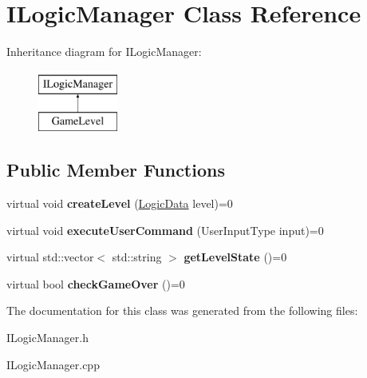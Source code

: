 \hypertarget{class_i_logic_manager}{}\section{I\+Logic\+Manager Class Reference}
\label{class_i_logic_manager}
Inheritance diagram for I\+Logic\+Manager\+:\begin{figure}[H]
\begin{center}
\leavevmode
\includegraphics[height=2.000000cm]{class_i_logic_manager}
\end{center}
\end{figure}
\subsection*{Public Member Functions}
\begin{DoxyCompactItemize}
\item 
\mbox{\label{class_i_logic_manager_a7c3df41254653f3556353dff3a04b48c}} 
virtual void {\bfseries create\+Level} (\mbox{\hyperlink{class_logic_data}{Logic\+Data}} level)=0
\item 
\mbox{\label{class_i_logic_manager_a531478a93285f5cdf6f22294638b27b3}} 
virtual void {\bfseries execute\+User\+Command} (User\+Input\+Type input)=0
\item 
\mbox{\label{class_i_logic_manager_a84c0a5dd05e195dc99a2c35880f7bfb9}} 
virtual std\+::vector$<$ std\+::string $>$ {\bfseries get\+Level\+State} ()=0
\item 
\mbox{\label{class_i_logic_manager_a4b756d111ec45b7d92ee0da4a5612a40}} 
virtual bool {\bfseries check\+Game\+Over} ()=0
\end{DoxyCompactItemize}


The documentation for this class was generated from the following files\+:\begin{DoxyCompactItemize}
\item 
I\+Logic\+Manager.\+h\item 
I\+Logic\+Manager.\+cpp\end{DoxyCompactItemize}
